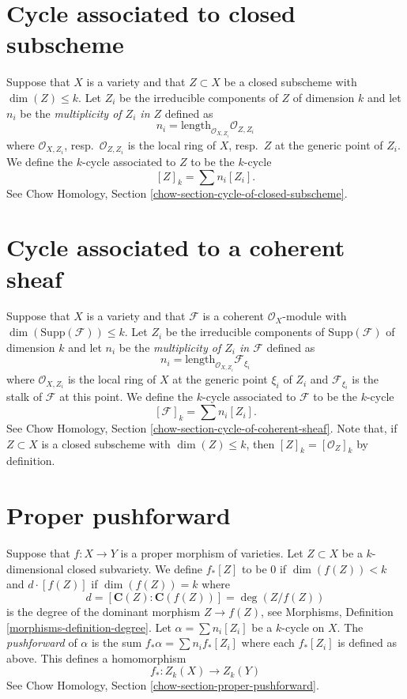 \documentclass{stacks-project}
\theoremstyle{plain}
\theoremstyle{definition}
\theoremstyle{remark}
\numberwithin{equation}{subsection}
\begin{document}
\section{Cycle associated to closed subscheme}
\label{section-cycle-of-closed}

\noindent
Suppose that $X$ is a variety and that $Z \subset X$ be a closed subscheme
with $\dim(Z) \leq k$. Let $Z_i$ be the irreducible components of $Z$ of
dimension $k$ and let $n_i$ be the {\it multiplicity of $Z_i$ in $Z$}
defined as
$$
n_i = \text{length}_{\mathcal{O}_{X, Z_i}} \mathcal{O}_{Z, Z_i}
$$
where $\mathcal{O}_{X, Z_i}$, resp.\ $\mathcal{O}_{Z, Z_i}$ is the
local ring of $X$, resp.\ $Z$ at the generic point of $Z_i$.
We define the $k$-cycle associated to $Z$ to be the $k$-cycle
$$
[Z]_k = \sum n_i [Z_i].
$$
See Chow Homology, Section \ref{chow-section-cycle-of-closed-subscheme}.


\section{Cycle associated to a coherent sheaf}
\label{section-cycle-of-coherent-sheaf}

\noindent
Suppose that $X$ is a variety and that
$\mathcal{F}$ is a coherent $\mathcal{O}_X$-module with
$\dim(\text{Supp}(\mathcal{F})) \leq k$.
Let $Z_i$ be the irreducible components of $\text{Supp}(\mathcal{F})$
of dimension $k$ and let $n_i$ be the
{\it multiplicity of $Z_i$ in $\mathcal{F}$} defined as
$$
n_i = \text{length}_{\mathcal{O}_{X, Z_i}} \mathcal{F}_{\xi_i}
$$
where $\mathcal{O}_{X, Z_i}$ is the
local ring of $X$ at the generic point $\xi_i$ of $Z_i$
and $\mathcal{F}_{\xi_i}$ is the stalk of $\mathcal{F}$ at this point.
We define the $k$-cycle associated to $\mathcal{F}$ to be the $k$-cycle
$$
[\mathcal{F}]_k = \sum n_i [Z_i].
$$
See Chow Homology, Section \ref{chow-section-cycle-of-coherent-sheaf}.
Note that, if $Z \subset X$ is a closed subscheme with $\dim(Z) \leq k$, then
$[Z]_k = [\mathcal{O}_Z]_k$ by definition.


\section{Proper pushforward}
\label{section-pushforward}

\noindent
Suppose that $f : X \to Y$ is a proper morphism of varieties.
Let $Z \subset X$ be a $k$-dimensional
closed subvariety. We define $f_*[Z]$ to be $0$ if $\dim(f(Z)) < k$
and $d \cdot [f(Z)]$ if $\dim(f(Z)) = k$ where
$$
d = [\mathbf{C}(Z) : \mathbf{C}(f(Z))] = \deg(Z/f(Z))
$$
is the degree of the dominant morphism $Z \to f(Z)$, see
Morphisms, Definition \ref{morphisms-definition-degree}.
Let $\alpha = \sum n_i [Z_i]$ be a $k$-cycle on $X$. The
{\it pushforward} of $\alpha$ is the sum $f_* \alpha = \sum n_i f_*[Z_i]$
where each $f_*[Z_i]$ is defined as above. This defines a homomorphism
$$
f_* : Z_k(X) \longrightarrow Z_k(Y)
$$
See Chow Homology, Section \ref{chow-section-proper-pushforward}.
\end{document}
